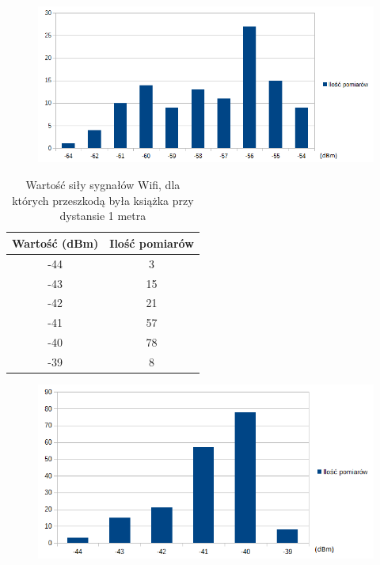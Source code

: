 \begin{figure}[H]			
\centering
\includegraphics[width=1.0\textwidth]{wykres_bluetooth_1}
\end{figure}
\begin{table}[H]
	\caption {Wartość siły sygnałów Wifi, dla których przeszkodą była książka przy dystansie 1 metra} 
\begin{center}
	\begin{tabular}{|c|c|}
		\hline
		Wartość (dBm) & Ilość pomiarów \\ 
		\hline
		-44 & 3\\
		\hline
		-43 & 15\\
		\hline
		-42 & 21\\
		\hline
		-41 & 57\\
		\hline
		-40 & 78\\
		\hline
		-39 & 8\\
		\hline
	\end{tabular}
\end{center}
\end{table}
\begin{figure}[H]			
\centering
\includegraphics[width=1.0\textwidth]{wykres_wifi_2}
\end{figure}
